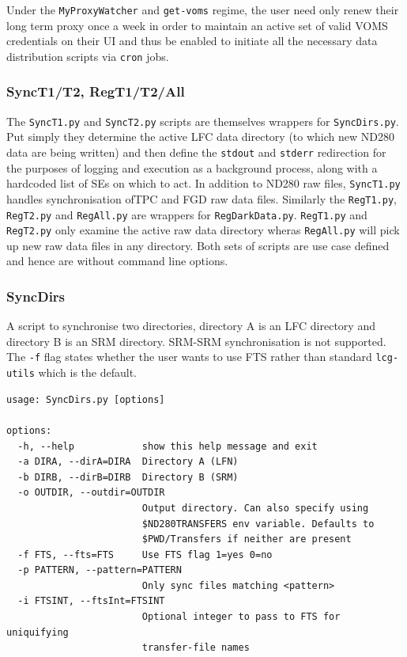 \documentclass[11pt]{article}
\begin{document}
Under the \verb+MyProxyWatcher+ and \verb+get-voms+ regime, the user
need only renew their long term proxy once a week in order to maintain
an active set of valid VOMS credentials on their UI and thus be
enabled to initiate all the necessary data distribution scripts via
\verb+cron+ jobs.

\subsubsection*{SyncT1/T2, RegT1/T2/All}
The \verb+SyncT1.py+ and \verb+SyncT2.py+ scripts are themselves
wrappers for \verb+SyncDirs.py+. Put simply they determine the active
LFC data directory (to which new ND280 data are being written) and then
define the \verb+stdout+ and \verb+stderr+ redirection for the
purposes of logging and execution as a background process, along with a
hardcoded list of SEs on which to act. In addition to ND280 raw files,
\verb+SyncT1.py+ handles synchronisation ofTPC and FGD raw data files.
Similarly the \verb+RegT1.py+, \verb+RegT2.py+ and \verb+RegAll.py+
are wrappers for \verb+RegDarkData.py+. \verb+RegT1.py+ and
\verb+RegT2.py+ only examine the active raw data directory wheras
\verb+RegAll.py+ will pick up new raw data files in any
directory. Both sets of scripts are use case defined  and hence are
without command line options.

\subsubsection*{SyncDirs}
A script to synchronise two directories, directory A is an LFC directory and
directory B is an SRM directory. SRM-SRM synchronisation is not supported.
The \verb+-f+ flag states whether the user wants to use FTS rather
than standard \verb+lcg-utils+ which is the default.
\begin{verbatim}
usage: SyncDirs.py [options]

options:
  -h, --help            show this help message and exit
  -a DIRA, --dirA=DIRA  Directory A (LFN)
  -b DIRB, --dirB=DIRB  Directory B (SRM)
  -o OUTDIR, --outdir=OUTDIR
                        Output directory. Can also specify using
                        $ND280TRANSFERS env variable. Defaults to
                        $PWD/Transfers if neither are present
  -f FTS, --fts=FTS     Use FTS flag 1=yes 0=no
  -p PATTERN, --pattern=PATTERN
                        Only sync files matching <pattern>
  -i FTSINT, --ftsInt=FTSINT
                        Optional integer to pass to FTS for uniquifying
                        transfer-file names
\end{verbatim}
\end{document}

